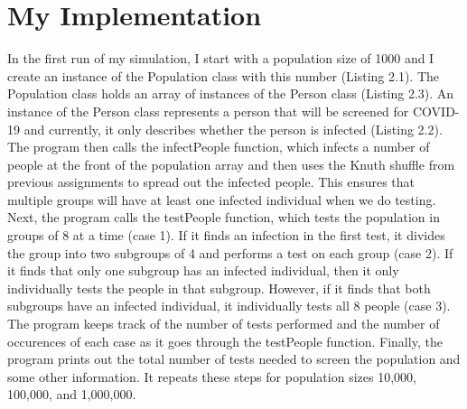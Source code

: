 \documentclass[letterpaper, 10pt,DIV=13]{scrartcl}
\numberwithin{equation}{section} %
\numberwithin{figure}{section} %
\numberwithin{table}{section} %
\begin{document}
\section{My Implementation}\label{operations}
In the first run of my simulation, I start with a population size of 1000 and I create an instance of the Population class with this number (Listing 2.1). The Population class holds an array of instances of the Person class (Listing 2.3). An instance of the Person class represents a person that will be screened for COVID-19 and currently, it only describes whether the person is infected (Listing 2.2). The program then calls the infectPeople function, which infects a number of people at the front of the population array and then uses the Knuth shuffle from previous assignments to spread out the infected people. This ensures that multiple groups will have at least one infected individual when we do testing. Next, the program calls the testPeople function, which tests the population in groups of 8 at a time (case 1). If it finds an infection in the first test, it divides the group into two subgroups of 4 and performs a test on each group (case 2). If it finds that only one subgroup has an infected individual, then it only individually tests the people in that subgroup. However, if it finds that both subgroups have an infected individual, it individually tests all 8 people (case 3). The program keeps track of the number of tests performed and the number of occurences of each case as it goes through the testPeople function. Finally, the program prints out the total number of tests needed to screen the population and some other information. It repeats these steps for population sizes 10,000, 100,000, and 1,000,000.
\end{document}
